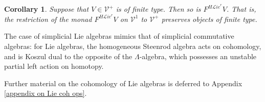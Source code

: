\documentclass[11pt]{amsart} \renewcommand{\baselinestretch}{1.2}
\theoremstyle{plain}
\newtheorem{cor}[thm]{Corollary}
\theoremstyle{definition}
\newcommand{\scrL}{\mathscr{L}}
\newcommand{\calV}{\mathcal{V}}
\newcommand{\vect}[2]{\calV^{#1}_{#2}}
\newcommand{\HA}[1]{H#1}
\newcommand{\liealgs}{{\scrL\!\textit{ie}}}
\newcommand{\restliealgs}{{\scrL\!\textit{ie}^\textit{r}}}
\begin{document}
\begin{Constructing cohomology operations}
\begin{cor}
\label{finite type pres by F lierest halg}
Suppose that $V\in\vect{+}{}$ is of finite type. Then so is $F^{\HA{\restliealgs}}V$. That is, the restriction of the monad $F^{\HA{\restliealgs}}V$ on $\vect{1}{}$ to $\vect{+}{}$ preserves objects of finite type.
\end{cor}

The case of simplicial Lie algebras mimics that of simplicial commutative algebras: for Lie algebras, the homogeneous Steenrod algebra acts on cohomology, and is Koszul dual to the opposite of the $\Lambda$-algebra, which possesses an unstable partial left action on  homotopy.

Further material on the cohomology of Lie algebras is deferred to Appendix \ref{appendix on Lie coh ops}.
\todo{$\liealgs$?}

\end{Constructing cohomology operations}
\end{document}
